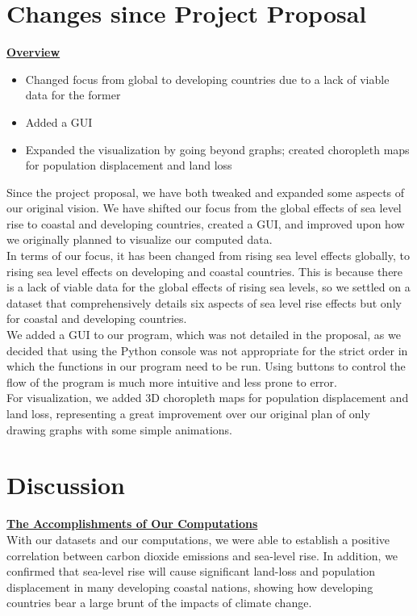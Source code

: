 \documentclass[fontsize=11pt]{article}
\begin{document}
\section*{Changes since Project Proposal}
\underline{\textbf{Overview}}
\begin{itemize}
    \item Changed focus from global to developing countries due to a lack of viable data for the former
    \item Added a GUI
    \item Expanded the visualization by going beyond graphs; created choropleth maps for population displacement and land loss
\end{itemize}
Since the project proposal, we have both tweaked and expanded some aspects of our original vision. We have shifted our focus from the global effects of sea level rise to coastal and developing countries, created a GUI, and improved upon how we originally planned to visualize our computed data.\\

In terms of our focus, it has been changed from rising sea level effects globally, to rising sea level effects on developing and coastal countries. This is because there is a lack of viable data for the global effects of rising sea levels, so we settled on a dataset that comprehensively details six aspects of sea level rise effects but only for coastal and developing countries.\\

We added a GUI to our program, which was not detailed in the proposal, as we decided that using the Python console was not appropriate for the strict order in which the functions in our program need to be run. Using buttons to control the flow of the program is much more intuitive and less prone to error.\\

For visualization, we added 3D choropleth maps for population displacement and land loss, representing a great improvement over our original plan of only drawing graphs with some simple animations.

\newpage
\section*{Discussion}
\textbf{\underline{The Accomplishments of Our Computations}}\\

With our datasets and our computations, we were able to establish a positive correlation between carbon dioxide emissions and sea-level rise. In addition, we confirmed that sea-level rise will cause significant land-loss and population displacement in many developing coastal nations, showing how developing countries bear a large brunt of the impacts of climate change. \\
\end{document}
